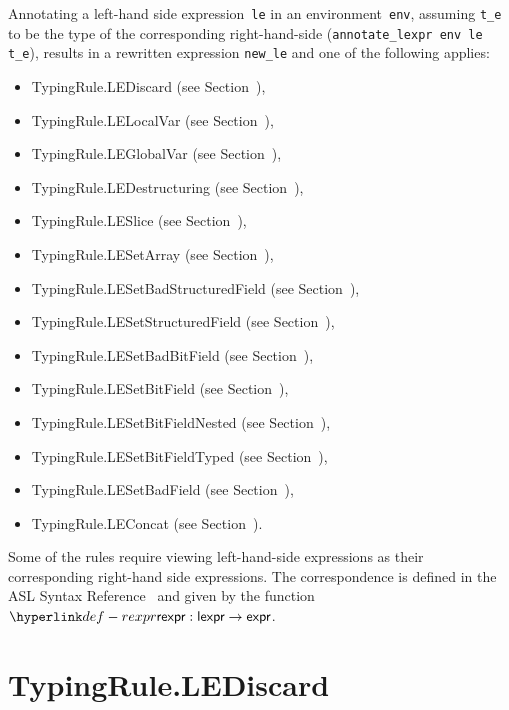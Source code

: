 \documentclass{book}
\begin{document}
\begin{itemize}
Annotating a left-hand side expression~\texttt{le} in an environment~\texttt{env}, assuming \texttt{t\_e}
to be the type of the corresponding right-hand-side (\texttt{annotate\_lexpr env le t\_e}),
results in a rewritten expression \texttt{new\_le} and one of the following applies:
\begin{itemize}
\item TypingRule.LEDiscard (see Section~),
\item TypingRule.LELocalVar (see Section~),
\item TypingRule.LEGlobalVar (see Section~),
\item TypingRule.LEDestructuring (see Section~),
\item TypingRule.LESlice (see Section~),
\item TypingRule.LESetArray (see Section~),
\item TypingRule.LESetBadStructuredField (see Section~),
\item TypingRule.LESetStructuredField (see Section~),
\item TypingRule.LESetBadBitField (see Section~),
\item TypingRule.LESetBitField (see Section~),
\item TypingRule.LESetBitFieldNested (see Section~),
\item TypingRule.LESetBitFieldTyped (see Section~),
\item TypingRule.LESetBadField (see Section~),
\item TypingRule.LEConcat (see Section~).
\end{itemize}

Some of the rules require viewing left-hand-side expressions as their corresponding right-hand side expressions.
The correspondence is defined in the ASL Syntax Reference~\cite[Chapter 5]{ASLAbstractSyntaxReference}
and given by the function $\torexpr : \lexpr \rightarrow \expr$.

\section{TypingRule.LEDiscard \label{sec:TypingRule.LEDiscard}}


\end{itemize}
\end{document}
